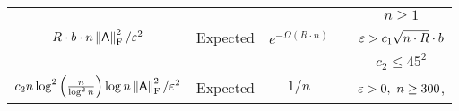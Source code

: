 \begin{center}
\begin{table}[ht]
\begin{tabular}{ || c | c | c | c | c ||}
	\hline
%
%
%
%
 	& & & & $n\geq 1$\\
	$R\cdot b \cdot n \left\|{\mathsf{A} }\right\|_{\textrm{F}}^2 /\varepsilon^2$   & {\footnotesize Expected} & $e^{-\Omega(R\cdot n ) }$ &   \cite{matrix:sparsification:Tropp}  & $\varepsilon > c_1\sqrt{n\cdot R} \cdot b$ \\
	\hline
%
%
%
%
%
%
	& & & & $c_2 \leq 45^2$ \\
	$c_2 n \log^2 \left(\frac{n}{\log^2 n}\right)\log n \left\|{\mathsf{A} }\right\|_{\textrm{F}}^2/\varepsilon^2$  & {\footnotesize Expected}  & $1/n$ &   \cite{drineas:sparsification_via_khintchine}  & $\eps>0,\ n\geq 300$, \\

\end{tabular}
\end{table}
\end{center}
